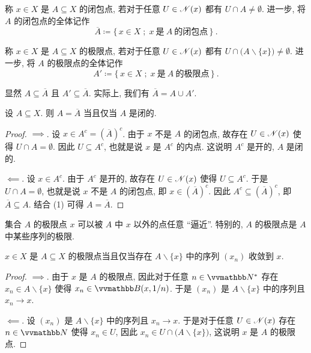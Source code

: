 \begin{definition}[闭包点]
    称 \(x \in X\) 是 \(A \subseteq X\) 的闭包点, 若对于任意 \(U \in \mathscr N(x)\) 都有 \(U \cap A \neq \emptyset\). 进一步, 将 \(A\) 的闭包点的全体记作
    \[
        \overline A \coloneqq \{\, x \in X \;;\; x\ \text{是}\ A\ \text{的闭包点} \,\}\ .
    \]
\end{definition}

\begin{definition}[极限点]
    称 \(x \in X\) 是 \(A \subseteq X\) 的极限点, 若对于任意 \(U \in \mathscr N(x)\) 都有 \(U \cap \bigl(A \backslash \{x\}\bigr) \neq \emptyset\). 进一步, 将 \(A\) 的极限点的全体记作
    \[
        A' \coloneqq \{\, x \in X \;;\; x\ \text{是}\ A\ \text{的极限点} \,\}\ .
    \]
\end{definition}

显然 \(A \subseteq \overline A\) 且 \(A' \subseteq \overline A\). 实际上, 我们有 \(\overline A = A \cup A'\).

\begin{proposition}\label{prop:closed-set-and-accumulation-point}
    设 \(A \subseteq X\). 则 \(A = \overline A\) 当且仅当 \(A\) 是闭的.
\end{proposition}

\begin{proof}
    \(\implies\). 设 \(x \in A^c = (\overline A)^c\). 由于 \(x\) 不是 \(A\) 的闭包点, 故存在 \(U \in \mathscr N(x)\) 使得 \(U \cap A = \emptyset\). 因此 \(U \subseteq A^c\), 也就是说 \(x\) 是 \(A^c\) 的内点. 这说明 \(A^c\) 是开的, \(A\) 是闭的.

    \(\impliedby\). 设 \(x \in A^c\). 由于 \(A^c\) 是开的, 故存在 \(U \in \mathscr N(x)\) 使得 \(U \subseteq A^c\). 于是 \(U \cap A = \emptyset\), 也就是说 \(x\) 不是 \(A\) 的闭包点, 即 \(x \in (\overline A)^c\). 因此 \(A^c \subseteq (\overline A)^c\), 即 \(\overline A \subseteq A\). 结合 (1) 可得 \(A = \overline A\).
\end{proof}

集合 \(A\) 的极限点 \(x\) 可以被 \(A\) 中 \(x\) 以外的点任意 ``逼近''. 特别的, \(A\) 的极限点是 \(A\) 中某些序列的极限.

\begin{proposition}\label{prop:charact-of-limit-point-via-sequence}
    \(x \in X\) 是 \(A \subseteq X\) 的极限点当且仅当存在 \(A \backslash \{x\}\) 中的序列 \((x_n)\) 收敛到 \(x\).
\end{proposition}

\begin{proof}
    \(\implies\). 由于 \(x\) 是 \(A\) 的极限点, 因此对于任意 \(n \in \N^\ast\) 存在 \(x_n \in A \backslash \{x\}\) 使得 \(x_n \in \B(x, 1 / n)\). 于是 \((x_n)\) 是 \(A \backslash \{x\}\) 中的序列且 \(x_n \to x\).

    \(\impliedby\). 设 \((x_n)\) 是 \(A \backslash \{x\}\) 中的序列且 \(x_n \to x\). 于是对于任意 \(U \in \mathscr N(x)\) 存在 \(n \in \N\) 使得 \(x_n \in U\), 因此 \(x_n \in U \cap \bigl(A \backslash \{x\}\bigr)\), 这说明 \(x\) 是 \(A\) 的极限点.
\end{proof}

